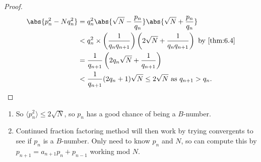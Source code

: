 \documentclass{article}
\begin{document}
\begin{proof}
    \begin{align*}
        \abs{p_n^2 - N q_n^2} &= q_n^2 \abs{\sqrt{N} - \frac{p_n}{q_n}}\abs{\sqrt{N} + \frac{p_n}{q_n}}  \\
                              &< q_n^2 \times \left(\frac{1}{q_n q_{n+1}}\right) \left(2 \sqrt{N} + \frac{1}{q_n q_{n+1}}\right) \text{ by \cref{thm:6.4}} \\
                              &= \frac{1}{q_{n+1}} \left(2 q_n \sqrt{N} + \frac{1}{q_{n+1}}\right) \\
                              &< \frac{1}{q_{n+1}} (2 q_n + 1) \sqrt{N} \leq 2 \sqrt{N} \text{ as } q_{n+1} > q_n. \qedhere
    \end{align*}
\end{proof}

\begin{remark}\leavevmode
    \begin{enumerate}[label=(\roman*)]
        \item So $\langle p_n^2 \rangle \leq 2 \sqrt{N}$, so $p_n$ has a good chance of being a $B$-number.
        \item Continued fraction factoring method will then work by trying convergents to see if $p_n$ is a $B$-number.
            Only need to know $p_n$ and $N$, so can compute this by $p_{n+1} = a_{n+1} p_n + p_{n-1}$ working mod $N$.
    \end{enumerate}
\end{remark}
\end{document}
